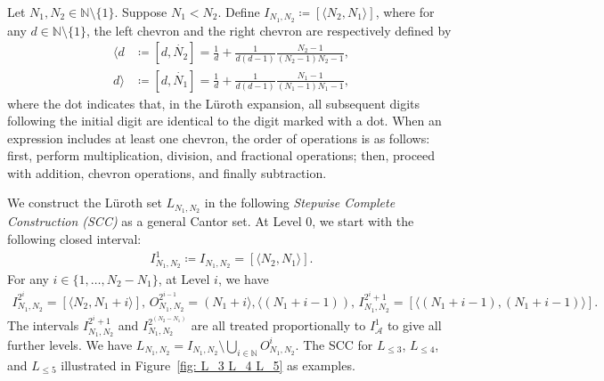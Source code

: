 \documentclass{ws-ijnt}
\begin{document}
	Let $N_1,N_2\in \mathbb{N}\setminus\{1\}$. Suppose $N_1<N_2$. Define $I_{N_1,N_2}\coloneqq [\langle N_2, N_1 \rangle]$, where for any $d\in\mathbb{N}\setminus\{1\}$, the left chevron and the right chevron are respectively defined by
	\begin{align*}
		\langle d
		&\coloneqq[d,\dot{N_2}]
		=\frac{1}{d}+\frac{1}{d(d-1)}\frac{N_2-1}{(N_2-1)N_2-1}, \\
		d\rangle
		&\coloneqq[d,\dot{N_1}]
		=\frac{1}{d}+\frac{1}{d(d-1)}\frac{N_1-1}{(N_1-1)N_1-1},
	\end{align*}
	where the dot indicates that, in the L\"uroth expansion, all subsequent digits following the initial digit are identical to the digit marked with a dot. When an expression includes at least one chevron, the order of operations is as follows: first, perform multiplication, division, and fractional operations; then, proceed with addition, chevron operations, and finally subtraction.
	
	We construct the L\"uroth set $L_{N_1,N_2}$ in the following \emph{Stepwise Complete Construction (SCC)} as a general Cantor set. At Level 0, we start with the following closed interval:
	\begin{align*}
		I_{N_1,N_2}^1
		\coloneqq I_{N_1,N_2}
		= \left[\langle N_2, N_1\rangle\right].
	\end{align*}
	For any $i\in\{1,\ldots,N_2-N_1\}$, at Level $i$, we have 
	\begin{align*}
		I_{N_1,N_2}^{2^i}
		= \left[\langle N_2,N_1+i \rangle\right], \,
		O_{N_1,N_2}^{2^{i-1}}
		= \left(N_1+i \rangle , \langle(N_1+i-1)\right), \,
		I_{N_1,N_2}^{2^i+1}
		= \left[\langle(N_1+i-1),(N_1+i-1)\rangle\right].
	\end{align*}
	The intervals $I_{N_1,N_2}^{2^i+1}$ and $I_{N_1,N_2}^{2^{(N_2-N_1)}}$ are all treated proportionally to $I_{\mathcal{A}}^{1}$ to give all further levels. We have $L_{N_1,N_2}=I_{N_1,N_2}\setminus\bigcup_{i\in\mathbb{N}}O_{N_1,N_2}^i$. The SCC for $L_{\leq 3}$, $L_{\leq 4}$, and $L_{\leq 5}$ illustrated in Figure~\ref{fig: L_3 L_4 L_5} as examples.
	
\end{document}
